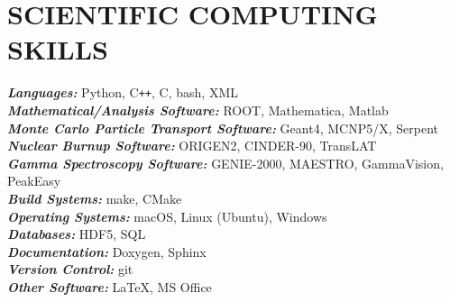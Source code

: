 \section{\small{SCIENTIFIC COMPUTING \\ SKILLS}}

{\sl\bf Languages:} \hfill Python, C\verb!++!, C, bash, XML\\
{\sl\bf Mathematical/Analysis Software:} \hfill ROOT, Mathematica, Matlab\\ 
{\sl\bf Monte Carlo Particle Transport Software:} \hfill Geant4, MCNP5/X, Serpent\\
{\sl\bf Nuclear Burnup Software:} \hfill ORIGEN2, CINDER-90, TransLAT\\
{\sl\bf Gamma Spectroscopy Software:} \hfill GENIE-2000, MAESTRO, GammaVision, PeakEasy\\
{\sl\bf Build Systems:} \hfill make, CMake\\
{\sl\bf Operating Systems:} \hfill macOS, Linux (Ubuntu), Windows\\
{\sl\bf Databases:} \hfill HDF5, SQL\\
{\sl\bf Documentation:} \hfill Doxygen, Sphinx\\
{\sl\bf Version Control:} \hfill git\\
{\sl\bf Other Software:} \hfill \LaTeX, MS Office

%